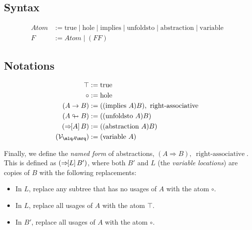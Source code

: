 \documentclass{article}
\begin{document}
  \subsection{Syntax}
  \begin{align*}
     Atom &:= \mathrm{true} \mid \mathrm{hole} \mid \mathrm{implies} \mid \mathrm{unfoldsto} \mid \mathrm{abstraction} \mid \mathrm{variable}\\
     F &:= Atom \mid (F F)
  \end{align*}

  \subsection{Notations}
  
  
  \newcommand{\true}{\top}
  \newcommand{\hole}{\circ}
  
  \renewcommand{\implies}{\rightarrow}
  \newcommand{\unfoldsto}{\looparrowright}
  \newcommand{\abstraction}[2]{\Rightarrow\hspace{-0.4em}[#1]\,#2}
  \newcommand{\variable}[1]{{\mathcal{V}_{\mlq\hspace{-0.06em}#1\hspace{-0.06em}\mrq}}}
  \begin{align*}
    \true &:= \mathrm{true}\\
    \hole &:= \mathrm{hole}\\
    (A \implies B) &:= ((\mathrm{implies}\ A) B),\ \operatorname{right-associative}\\
    (A \unfoldsto B) &:= ((\mathrm{unfoldsto}\ A) B)\\
    (\abstraction{A}{B}) &:= ((\mathrm{abstraction}\ A) B)\\
    (\variable{A}) &:= (\mathrm{variable}\ A)\\
  \end{align*}

  \newcommand{\nameabstraction}[2]{#1 \Rightarrow #2}

  Finally, we define the \emph{named form} of abstractions, $(\nameabstraction{A}{B}),\ \operatorname{right-associative}$.
  This is defined as $(\abstraction{L}{B'})$, where both $B'$ and $L$ (the \emph{variable locations}) are copies of $B$ with the following replacements:
  \begin{itemize}
    \item In $L$, replace any subtree that has no usages of $A$ with the atom $\hole$.
    \item In $L$, replace all usages of $A$ with the atom $\true$.
    \item In $B'$, replace all usages of $A$ with the atom $\hole$.
  \end{itemize}
\end{document}
